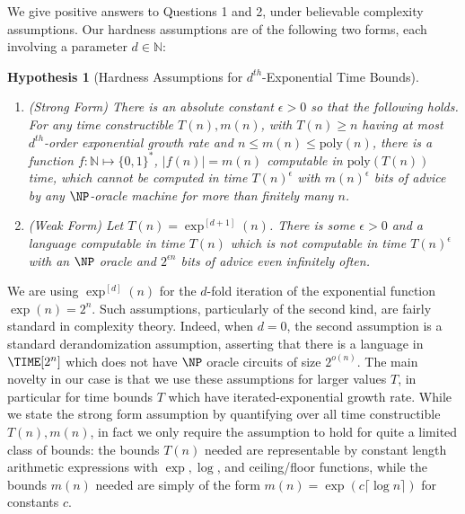 \documentclass[11pt]{article}
\newtheorem*{hypothesis*}{Hypothesis}
\newcommand{\B}{\{0,1\}}
\newcommand{\todo}[1]{{\color{red} TODO: #1}}
\renewcommand{\poly}{\mathrm{poly}}
\begin{document}
We give positive answers to Questions 1 and 2, under believable complexity assumptions. Our hardness assumptions are of the following two forms, each involving a parameter $d \in \mathbb{N}$:
\begin{hypothesis*}[Hardness Assumptions for $d^{th}$-Exponential Time Bounds]\label{hyp:intro}
~
\begin{enumerate}
    \item (Strong Form) There is an absolute constant $\epsilon > 0$ so that the following holds. For any time constructible $T(n), m(n)$, with $T(n) \geq n$ having at most $d^{th}$-order exponential growth rate and $n \leq m(n) \leq \poly(n)$, there is a function $f:\mathbb{N} \mapsto \B^{*}$, $|f(n)| =m(n)$ computable in $\poly(T(n))$ time, which cannot be computed in time $T(n)^\epsilon$ with $m(n)^\epsilon$ bits of advice by any $\NP$-oracle machine for more than finitely many $n$.
    \item (Weak Form) Let $T(n) = \exp^{[d+1]}(n)$. There is some $\epsilon>0$ and a language computable in time $T(n)$ which is not computable in time $T(n)^\epsilon$ with an $\NP$ oracle and $2^{\epsilon n}$ bits of advice even infinitely often.
\end{enumerate}
\end{hypothesis*}

We are using $\exp^{[d]}(n)$ for the $d$-fold iteration of the exponential function $\exp(n) = 2^n$. Such assumptions, particularly of the second kind, are fairly standard in complexity theory. Indeed, when $d = 0$, the second assumption is a standard derandomization assumption, asserting that there is a language in $\TIME[2^{n}]$ which does not have $\NP$ oracle circuits of size $2^{o(n)}$. The main novelty in our case is that we use these assumptions for larger values $T$, in particular for time bounds $T$ which have iterated-exponential growth rate. While we state the strong form assumption by quantifying over all time constructible $T(n),m(n)$, in fact we only require the assumption to hold for quite a limited class of bounds: the bounds $T(n)$ needed are representable by constant length arithmetic expressions with $\exp,\log$, and ceiling/floor functions, while the bounds $m(n)$ needed are simply of the form $m(n) = \exp(c\lceil \log n \rceil )$ for constants $c$.

\end{document}
